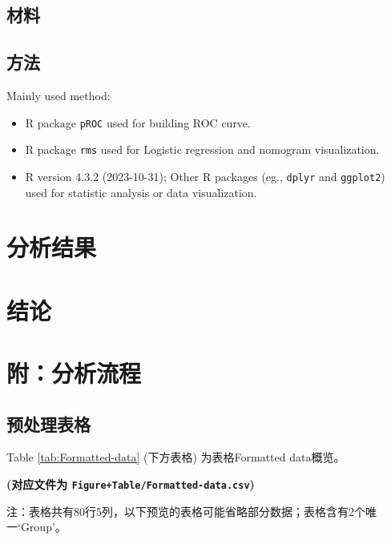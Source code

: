\documentclass[
]{article}
\providecommand{\tightlist}{%
  \setlength{\itemsep}{0pt}\setlength{\parskip}{0pt}}
\begin{document}
\hypertarget{ux6750ux6599}{%
\subsection{材料}\label{ux6750ux6599}}

\hypertarget{ux65b9ux6cd5}{%
\subsection{方法}\label{ux65b9ux6cd5}}

Mainly used method:

\begin{itemize}
\tightlist
\item
  R package \texttt{pROC} used for building ROC curve.
\item
  R package \texttt{rms} used for Logistic regression and nomogram visualization.
\item
  R version 4.3.2 (2023-10-31); Other R packages (eg., \texttt{dplyr} and \texttt{ggplot2}) used for statistic analysis or data visualization.
\end{itemize}

\hypertarget{results}{%
\section{分析结果}\label{results}}

\hypertarget{dis}{%
\section{结论}\label{dis}}

\hypertarget{workflow}{%
\section{附：分析流程}\label{workflow}}

\hypertarget{ux9884ux5904ux7406ux8868ux683c}{%
\subsection{预处理表格}\label{ux9884ux5904ux7406ux8868ux683c}}

Table \ref{tab:Formatted-data} (下方表格) 为表格Formatted data概览。

\textbf{(对应文件为 \texttt{Figure+Table/Formatted-data.csv})}

\begin{center}\begin{tcolorbox}[colback=gray!10, colframe=gray!50, width=0.9\linewidth, arc=1mm, boxrule=0.5pt]注：表格共有80行5列，以下预览的表格可能省略部分数据；表格含有2个唯一`Group'。
\end{tcolorbox}
\end{center}
\end{document}
